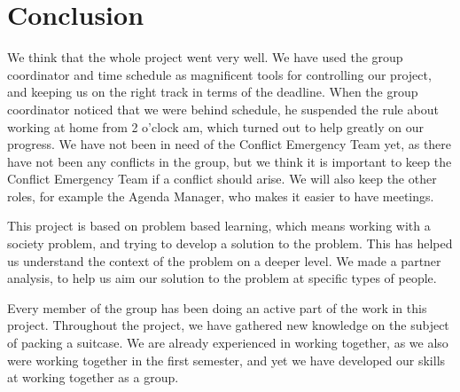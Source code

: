 \chapter{Conclusion}
We think that the whole project went very well. We have used the group coordinator and time schedule as magnificent tools for controlling our project, and keeping us on the right track in terms of the deadline. When the group coordinator noticed that we were behind schedule, he suspended the rule about working at home from 2 o'clock am, which turned out to help greatly on our progress. We have not been in need of the Conflict Emergency Team yet, as there have not been any conflicts in the group, but we think it is important to keep the Conflict Emergency Team if a conflict should arise. We will also keep the other roles, for example the Agenda Manager, who makes it easier to have meetings. 

This project is based on problem based learning, which means working with a society problem, and trying to develop a solution to the problem. This has helped us understand the context of the problem on a deeper level. We made a partner analysis, to help us aim our solution to the problem at specific types of people.

Every member of the group has been doing an active part of the work in this project. Throughout the project, we have gathered new knowledge on the subject of packing a suitcase. We are already experienced in working together, as we also were working together in the first semester, and yet we have developed our skills at working together as a group. 